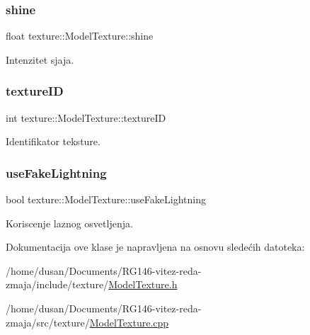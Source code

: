\subsubsection{\texorpdfstring{shine}{shine}}
{\footnotesize\ttfamily float texture\+::\+Model\+Texture\+::shine\hspace{0.3cm}{\ttfamily [private]}}



Intenzitet sjaja. 

\mbox{\label{classtexture_1_1ModelTexture_a0dca1304604e6b705acb0460b66fce36}} 
\subsubsection{\texorpdfstring{texture\+ID}{textureID}}
{\footnotesize\ttfamily int texture\+::\+Model\+Texture\+::texture\+ID\hspace{0.3cm}{\ttfamily [private]}}



Identifikator teksture. 

\mbox{\label{classtexture_1_1ModelTexture_aa14650f7cc629b9f5c0ed15f82b22cad}} 
\subsubsection{\texorpdfstring{use\+Fake\+Lightning}{useFakeLightning}}
{\footnotesize\ttfamily bool texture\+::\+Model\+Texture\+::use\+Fake\+Lightning\hspace{0.3cm}{\ttfamily [private]}}



Koriscenje laznog osvetljenja. 



Dokumentacija ove klase je napravljena na osnovu sledećih datoteka\+:\begin{DoxyCompactItemize}
\item 
/home/dusan/\+Documents/\+R\+G146-\/vitez-\/reda-\/zmaja/include/texture/\hyperlink{ModelTexture_8h}{Model\+Texture.\+h}\item 
/home/dusan/\+Documents/\+R\+G146-\/vitez-\/reda-\/zmaja/src/texture/\hyperlink{ModelTexture_8cpp}{Model\+Texture.\+cpp}\end{DoxyCompactItemize}
